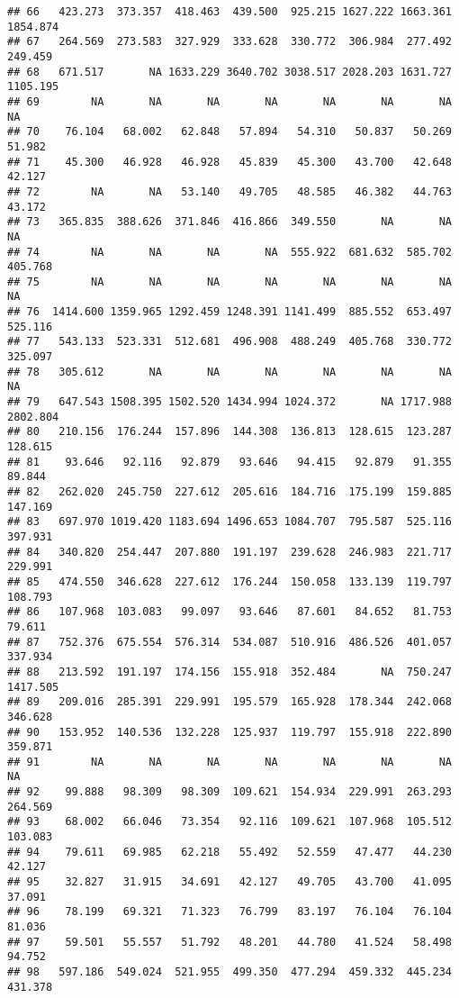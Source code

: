 \documentclass[
]{article}
\begin{document}
\begin{verbatim}
## 66   423.273  373.357  418.463  439.500  925.215 1627.222 1663.361 1854.874
## 67   264.569  273.583  327.929  333.628  330.772  306.984  277.492  249.459
## 68   671.517       NA 1633.229 3640.702 3038.517 2028.203 1631.727 1105.195
## 69        NA       NA       NA       NA       NA       NA       NA       NA
## 70    76.104   68.002   62.848   57.894   54.310   50.837   50.269   51.982
## 71    45.300   46.928   46.928   45.839   45.300   43.700   42.648   42.127
## 72        NA       NA   53.140   49.705   48.585   46.382   44.763   43.172
## 73   365.835  388.626  371.846  416.866  349.550       NA       NA       NA
## 74        NA       NA       NA       NA  555.922  681.632  585.702  405.768
## 75        NA       NA       NA       NA       NA       NA       NA       NA
## 76  1414.600 1359.965 1292.459 1248.391 1141.499  885.552  653.497  525.116
## 77   543.133  523.331  512.681  496.908  488.249  405.768  330.772  325.097
## 78   305.612       NA       NA       NA       NA       NA       NA       NA
## 79   647.543 1508.395 1502.520 1434.994 1024.372       NA 1717.988 2802.804
## 80   210.156  176.244  157.896  144.308  136.813  128.615  123.287  128.615
## 81    93.646   92.116   92.879   93.646   94.415   92.879   91.355   89.844
## 82   262.020  245.750  227.612  205.616  184.716  175.199  159.885  147.169
## 83   697.970 1019.420 1183.694 1496.653 1084.707  795.587  525.116  397.931
## 84   340.820  254.447  207.880  191.197  239.628  246.983  221.717  229.991
## 85   474.550  346.628  227.612  176.244  150.058  133.139  119.797  108.793
## 86   107.968  103.083   99.097   93.646   87.601   84.652   81.753   79.611
## 87   752.376  675.554  576.314  534.087  510.916  486.526  401.057  337.934
## 88   213.592  191.197  174.156  155.918  352.484       NA  750.247 1417.505
## 89   209.016  285.391  229.991  195.579  165.928  178.344  242.068  346.628
## 90   153.952  140.536  132.228  125.937  119.797  155.918  222.890  359.871
## 91        NA       NA       NA       NA       NA       NA       NA       NA
## 92    99.888   98.309   98.309  109.621  154.934  229.991  263.293  264.569
## 93    68.002   66.046   73.354   92.116  109.621  107.968  105.512  103.083
## 94    79.611   69.985   62.218   55.492   52.559   47.477   44.230   42.127
## 95    32.827   31.915   34.691   42.127   49.705   43.700   41.095   37.091
## 96    78.199   69.321   71.323   76.799   83.197   76.104   76.104   81.036
## 97    59.501   55.557   51.792   48.201   44.780   41.524   58.498   94.752
## 98   597.186  549.024  521.955  499.350  477.294  459.332  445.234  431.378

\end{verbatim}
\end{document}
